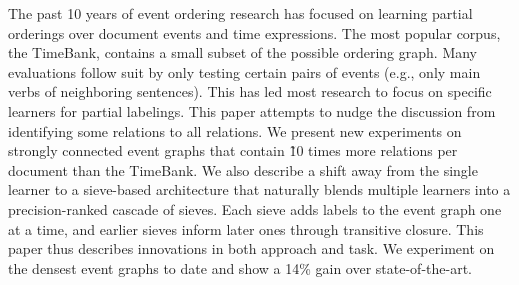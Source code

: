 The past 10 years of event ordering research has focused on learning partial orderings over document events and time expressions. The most popular corpus, the TimeBank, contains a small subset of the possible ordering graph. Many evaluations follow suit by only testing certain pairs of events (e.g., only main verbs of neighboring sentences). This has led most research to focus on specific learners for partial labelings. This paper attempts to nudge the discussion from identifying some relations to all relations. We present new experiments on strongly connected event graphs that contain \~10 times more relations per document than the TimeBank. We also describe a shift away from the single learner to a sieve-based architecture that naturally blends multiple learners into a precision-ranked cascade of sieves. Each sieve adds labels to the event graph one at a time, and earlier sieves inform later ones through transitive closure. This paper thus describes innovations in both approach and task. We experiment on the densest event graphs to date and show a 14\% gain over state-of-the-art.
